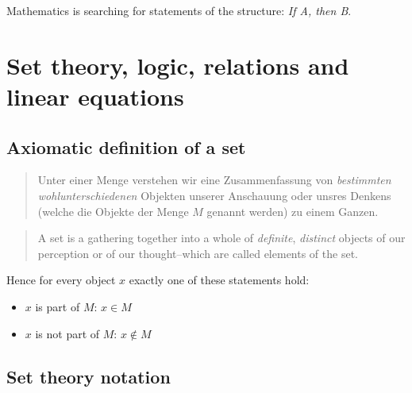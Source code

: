 \documentclass[a4paper,landscape,twocolumn]{article}
\begin{document}
Mathematics is searching for statements of the structure: \emph{If A, then B}.

\section{Set theory, logic, relations and linear equations}
\subsection{Axiomatic definition of a set}

\begin{quote}
  Unter einer Menge verstehen wir eine Zusammenfassung von \emph{bestimmten}
  \emph{wohlunterschiedenen} Objekten unserer Anschauung oder unsres Denkens
  (welche die Objekte der Menge $M$ genannt werden) zu einem Ganzen.
\end{quote}
\begin{quote}
  A set is a gathering together into a whole of \emph{definite}, \emph{distinct} objects
  of our perception or of our thought--which are called elements of the set.
\end{quote}

Hence for every object $x$ exactly one of these statements hold:
\begin{itemize}
    \item $x$ is part of $M$: $x \in M$
    \item $x$ is not part of $M$: $x \not\in M$
\end{itemize}

\subsection{Set theory notation}
\end{document}
